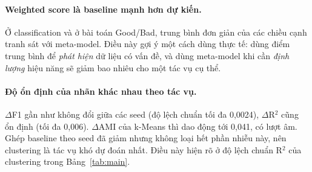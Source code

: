 \paragraph{Weighted score là baseline mạnh hơn dự kiến.} Ở classification và ở bài toán Good/Bad, trung bình đơn giản của các chiều cạnh tranh sát với meta-model. Điều này gợi ý một cách dùng thực tế: dùng điểm trung bình để \emph{phát hiện} dữ liệu có vấn đề, và dùng meta-model khi cần \emph{định lượng} hiệu năng sẽ giảm bao nhiêu cho một tác vụ cụ thể.

\paragraph{Độ ổn định của nhãn khác nhau theo tác vụ.} $\Delta$F1 gần như không đổi giữa các seed (độ lệch chuẩn tối đa 0,0024), $\Delta$R$^2$ cũng ổn định (tối đa 0,006). $\Delta$AMI của k-Means thì dao động tới 0,041, có lượt âm. Ghép baseline theo seed đã giảm nhưng không loại hết phần nhiễu này, nên clustering là tác vụ khó dự đoán nhất. Điều này hiện rõ ở độ lệch chuẩn R$^2$ của clustering trong Bảng~\ref{tab:main}.
